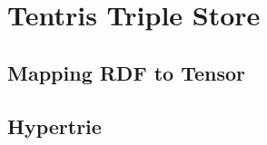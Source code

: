 \section{Tentris Triple Store}
\label{sec:preliminaries:tentris}

\subsection{Mapping RDF to Tensor}

\subsection{Hypertrie}
